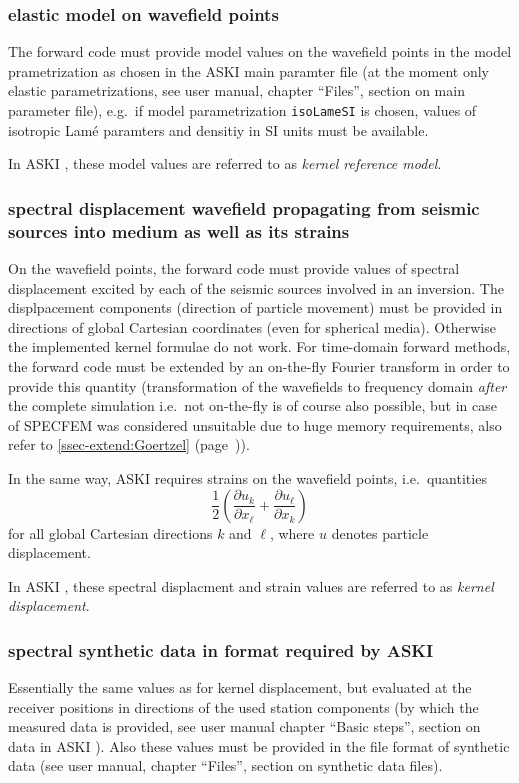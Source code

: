 \documentclass[12pt,a4paper]{article}
\newcommand{\lcode}[1]{\nolinkurl{#1}}
\newcommand{\ASKI}{ {\ttfamily ASKI} }
\newcommand{\myref}[1]{\ref{#1} (page~\pageref{#1})}
\begin{document}
\subsubsection{elastic model on wavefield points}
The forward code must provide model values on the wavefield points in the model prametrization as chosen in 
the \ASKI{} main paramter file (at the moment only elastic parametrizations, see user manual, chapter ``Files'', 
section on main parameter file), e.g.\ if model parametrization \lcode{isoLameSI} is chosen, values of 
isotropic Lam\'e paramters and densitiy in SI units must be available.

In \ASKI{}, these model values are referred to as \emph{kernel reference model}.

\subsubsection{spectral displacement wavefield propagating from seismic sources into medium as well as its strains}
On the wavefield points, the forward code must provide values of spectral displacement excited by each of the seismic 
sources involved in an inversion. The displpacement components (direction of particle movement) must be provided 
in directions of global Cartesian coordinates (even for spherical media). Otherwise the implemented kernel formulae 
do not work. For time-domain forward methods, the forward code must be extended by an
on-the-fly Fourier transform in order to provide this quantity (transformation of the wavefields to 
frequency domain \emph{after} the complete simulation i.e.\ not on-the-fly is of course also possible, but in 
case of SPECFEM was considered unsuitable due to huge memory requirements, also refer to \myref{ssec-extend:Goertzel}).

In the same way, \ASKI{} requires strains on the wavefield points, i.e.\ quantities
\[
\frac{1}{2}\left(\frac{\partial u_k}{\partial x_\ell} + \frac{\partial u_\ell}{\partial x_k}\right)
\]
for all global Cartesian directions $k$ and $\ell$, where $u$ denotes particle displacement.

In \ASKI{}, these spectral displacment and strain values are referred to as \emph{kernel displacement}.

\subsubsection{spectral synthetic data in format required by \ASKI{}} \label{subsub:synthetic_data}
Essentially the same values as for kernel displacement, but evaluated at the receiver positions 
in directions of the used station components (by which the measured data is provided, see user manual chapter
``Basic steps'', section on data in \ASKI{}). Also these values must be provided in the file format of synthetic
data (see user manual, chapter ``Files'', section on synthetic data files).
\end{document}
